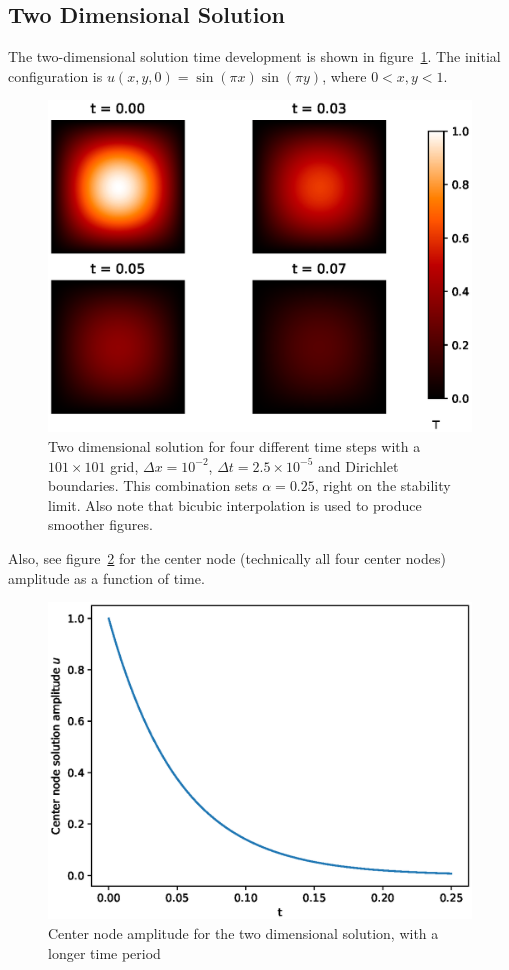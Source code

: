 \documentclass[aps,reprint]{revtex4-1}
\begin{document}
\subsection{Two Dimensional Solution}
The two-dimensional solution time development is shown in figure~\ref{fig:twodimsolution}.
The initial configuration is $u(x,y,0) = \sin{(\pi x)} \sin{(\pi y)}$, where
$0 < x,y < 1$.
\begin{figure}[ht]
  \includegraphics[width=\columnwidth]{figures/twodim.eps}
  \caption{Two dimensional solution for four different time steps with a
  $101 \times 101$ grid, $\Delta x = 10^{-2}$, $\Delta t = 2.5 \times 10^{-5}$
  and Dirichlet boundaries. This combination sets $\alpha = 0.25$, right on the stability limit.
  Also note that bicubic interpolation is used to produce smoother figures.
  }
  \label{fig:twodimsolution}
\end{figure}
Also, see figure~\ref{fig:twodimamplitude} for the center node (technically all four
center nodes) amplitude as a function of time.
\begin{figure}[ht]
  \includegraphics[width=\columnwidth]{figures/twodimamplitude.eps}
  \caption{Center node amplitude for the two dimensional solution, with a longer
  time period}
  \label{fig:twodimamplitude}
\end{figure}
\end{document}
